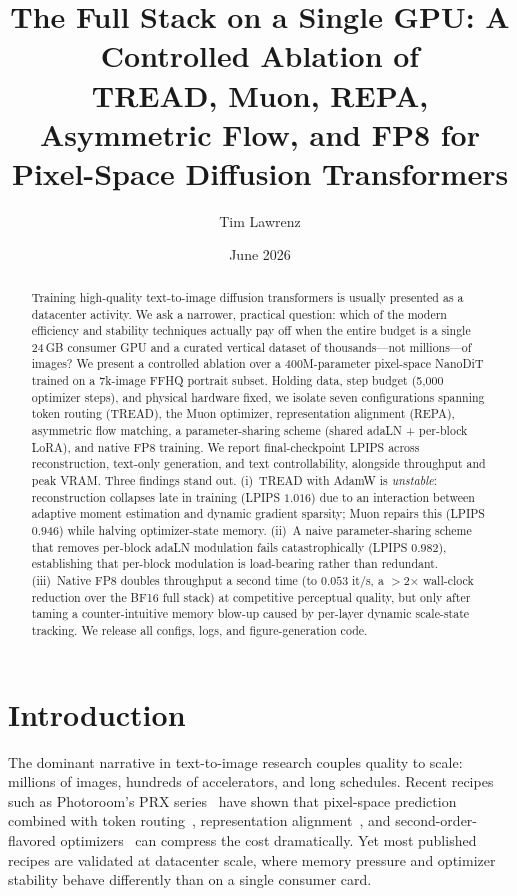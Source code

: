 \documentclass[10pt,twocolumn]{article}
\title{\textbf{The Full Stack on a Single GPU: A Controlled Ablation of\\
TREAD, Muon, REPA, Asymmetric Flow, and FP8 for\\
Pixel-Space Diffusion Transformers}}
\author[1]{Tim Lawrenz}
\affil[1]{Independent Researcher \\ \texttt{tim@lawrenz.dev}}
\date{June 2026}
\begin{document}
\maketitle

\begin{abstract}
Training high-quality text-to-image diffusion transformers is usually presented
as a datacenter activity. We ask a narrower, practical question: which of the
modern efficiency and stability techniques actually pay off when the entire
budget is a single 24\,GB consumer GPU and a curated vertical dataset of
thousands---not millions---of images? We present a controlled ablation over a
400M-parameter pixel-space NanoDiT trained on a 7k-image FFHQ portrait subset.
Holding data, step budget (5{,}000 optimizer steps), and physical hardware
fixed, we isolate seven configurations spanning token routing (TREAD), the Muon
optimizer, representation alignment (REPA), asymmetric flow matching, a
parameter-sharing scheme (shared adaLN + per-block LoRA), and native FP8
training. We report final-checkpoint LPIPS across reconstruction, text-only
generation, and text controllability, alongside throughput and peak VRAM.
Three findings stand out. (i)~TREAD with AdamW is \emph{unstable}: reconstruction
collapses late in training (LPIPS $1.016$) due to an interaction between
adaptive moment estimation and dynamic gradient sparsity; Muon repairs this
(LPIPS $0.946$) while halving optimizer-state memory. (ii)~A naive
parameter-sharing scheme that removes per-block adaLN modulation fails
catastrophically (LPIPS $0.982$), establishing that per-block modulation is
load-bearing rather than redundant. (iii)~Native FP8 doubles throughput a second
time (to $0.053$ it/s, a $>$2$\times$ wall-clock reduction over the BF16 full
stack) at competitive perceptual quality, but only after taming a
counter-intuitive memory blow-up caused by per-layer dynamic scale-state
tracking. We release all configs, logs, and figure-generation code.
\end{abstract}

\section{Introduction}
The dominant narrative in text-to-image research couples quality to scale:
millions of images, hundreds of accelerators, and long schedules. Recent recipes
such as Photoroom's PRX series~\citep{photoroom_prx3} have shown that pixel-space
prediction~\citep{li2025xprediction} combined with token
routing~\citep{krause2025tread}, representation alignment~\citep{yu2024repa}, and
second-order-flavored optimizers~\citep{jordan2024muon} can compress the cost
dramatically. Yet most published recipes are
validated at datacenter scale, where memory pressure and optimizer stability
behave differently than on a single consumer card.
\end{document}
